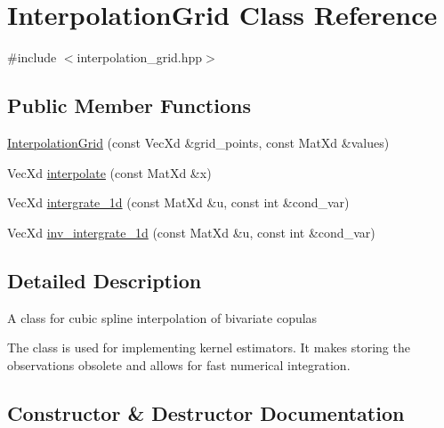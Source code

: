 \hypertarget{class_interpolation_grid}{}\section{Interpolation\+Grid Class Reference}
\label{class_interpolation_grid}


{\ttfamily \#include $<$interpolation\+\_\+grid.\+hpp$>$}

\subsection*{Public Member Functions}
\begin{DoxyCompactItemize}
\item 
\hyperlink{class_interpolation_grid_aed2639844689b97483d665feb5d0d0f7}{Interpolation\+Grid} (const Vec\+Xd \&grid\+\_\+points, const Mat\+Xd \&values)
\item 
Vec\+Xd \hyperlink{class_interpolation_grid_a9e65596940b5e561ef6332d2559feb57}{interpolate} (const Mat\+Xd \&x)
\item 
Vec\+Xd \hyperlink{class_interpolation_grid_a90af7bd3f2646109be939fc48b2284ca}{intergrate\+\_\+1d} (const Mat\+Xd \&u, const int \&cond\+\_\+var)
\item 
Vec\+Xd \hyperlink{class_interpolation_grid_aba233f98f869c2aeff0d920a1dd477d6}{inv\+\_\+intergrate\+\_\+1d} (const Mat\+Xd \&u, const int \&cond\+\_\+var)
\end{DoxyCompactItemize}


\subsection{Detailed Description}
A class for cubic spline interpolation of bivariate copulas

The class is used for implementing kernel estimators. It makes storing the observations obsolete and allows for fast numerical integration. 

\subsection{Constructor \& Destructor Documentation}
\mbox{\label{class_interpolation_grid_aed2639844689b97483d665feb5d0d0f7}} 

